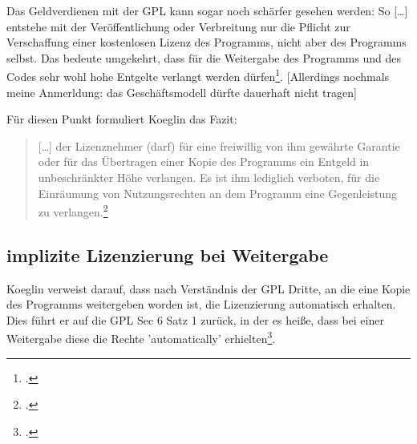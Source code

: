 \documentclass[DIV=calc,BCOR=5mm,11pt,headings=small,oneside,abstract=true, toc=bib]{scrartcl}
\begin{document}
Das Geldverdienen mit der GPL kann sogar noch schärfer gesehen werden: So
\glqq{}[\ldots] entstehe mit der Veröffentlichung oder Verbreitung nur
die Pflicht zur Verschaffung einer kostenlosen Lizenz des Programms,
nicht aber des Programms selbst\grqq{}. Das bedeute umgekehrt, dass für die
Weitergabe des Programms und des Codes sehr wohl \glqq{}hohe Entgelte\grqq{}
verlangt werden dürfen\footcite[vgl.][213]{Koglin2007a}. [Allerdings nochmals
meine Anmerldung: das Geschäftsmodell dürfte dauerhaft nicht tragen]

Für diesen Punkt formuliert Koeglin das Fazit:
\begin{quote}\glqq{}[\ldots] der Lizenznehmer (darf) für eine freiwillig
von ihm gewährte Garantie oder für das Übertragen einer Kopie des
Programms ein Entgeld in unbeschränkter Höhe verlangen. Es ist ihm
lediglich verboten, für die Einräumung von Nutzungsrechten an dem
Programm eine Gegenleistung zu
verlangen.\grqq{}\footcite[vgl.][228]{Koglin2007a}
\end{quote}
 
\subsection{implizite Lizenzierung bei Weitergabe}
Koeglin verweist darauf, dass nach Verständnis der GPL Dritte, an die eine Kopie
des Programms weitergeben worden ist, die Lizenzierung automatisch erhalten.
Dies führt er auf die GPL Sec 6 Satz 1 zurück, in der es heiße, dass bei einer
Weitergabe diese die Rechte 'automatically'
erhielten\footcite[vgl.][186]{Koglin2007a}.

\small

\end{document}
